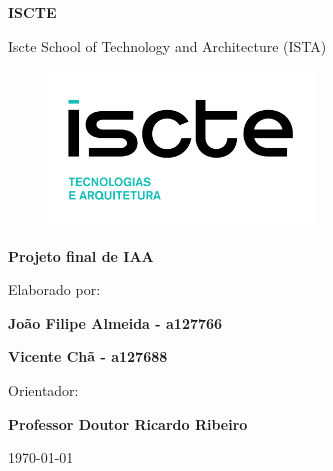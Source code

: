 \thispagestyle{empty}
\setcounter{page}{-1}

\begin{center}
\begin{Huge}
\textbf{ISCTE}
\end{Huge}
\end{center}

\begin{center}
\begin{Huge}
Iscte School of Technology and Architecture (ISTA)
\end{Huge}
\end{center}

\vspace{0,07cm}
\begin{figure}[!htb]
\centering
\includegraphics[width=200pt]{images/ISCTE_ISTA.png}
\end{figure}

\vspace{0.5cm}
\begin{center}
\begin{Large}
\textbf{Projeto final de IAA}
\end{Large}
\end{center}


\vspace{0.5cm}
\begin{center}
\begin{normalsize}
\begin{large}
Elaborado por:
\end{large}
\end{normalsize}
\end{center}

\vspace{0.2cm}
\begin{center}
\begin{large}
\textbf{João Filipe Almeida - a127766}

\textbf{Vicente Chã - a127688}
\end{large}
\end{center}

\vspace{0,5cm}
\begin{center}
\begin{normalsize}
\begin{large}
Orientador:
\end{large}
\end{normalsize}
\end{center}

\vspace{0.2cm}
\begin{center}
\begin{large}
\textbf{Professor Doutor Ricardo Ribeiro}
\end{large}
\end{center}



\vspace{0.5cm}
\begin{center}
\begin{normalsize}
\today
\end{normalsize}
\end{center}
